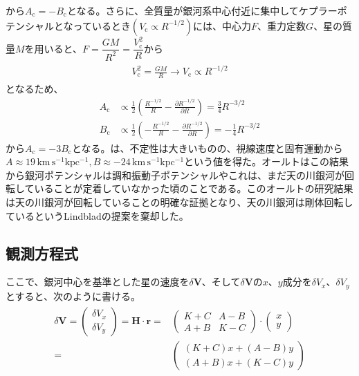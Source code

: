 から$A_{\mathrm{c}} = -B_{\mathrm{c}}$となる。さらに、全質量が銀河系中心付近に集中してケプラーポテンシャルとなっているとき$(V_{\mathrm{c}} \propto R^{-1/2})$には、中心力$F$、重力定数$G$、星の質量$M$を用いると、$F = \dfrac{GM}{R^2} = \dfrac{V_{\mathrm{c}}^2}{R}$から
\begin{align}
\begin{aligned}
    V_{\mathrm{c}}^2 = \frac{GM}{R} \to V_{\mathrm{c}} \propto R^{-1/2}
\end{aligned}
\end{align}
となるため、
\begin{subequations}
\begin{align}
	A_{\mathrm{c}} &\propto \frac{1}{2}\left( \frac{R^{-1/2}}{R} - \frac{\partial R^{-1/2}}{\partial R} \right) = \frac{3}{4}R^{-3/2}\\
	B_{\mathrm{c}} &\propto \frac{1}{2}\left( -\frac{R^{-1/2}}{R} - \frac{\partial R^{-1/2}}{\partial R} \right) = -\frac{1}{4}R^{-3/2}
\end{align}
\end{subequations}
から$A_{\mathrm{c}}=-3B_{\mathrm{c}}$となる。\cite{Oort1927b}は、不定性は大きいものの、視線速度と固有運動から$A\approx 19\,\mathrm{km\,s^{-1} kpc^{-1}}, B\approx -24\,\mathrm{km\,s^{-1} kpc^{-1}}$という値を得た。オールトはこの結果から銀河ポテンシャルは調和振動子ポテンシャルやこれは、まだ天の川銀河が回転していることが定着していなかった頃のことである。このオールトの研究結果は天の川銀河が回転していることの明確な証拠となり、天の川銀河は剛体回転しているというLindbladの提案を棄却した。



\subsection{観測方程式 \label{観測方程式}}
ここで、銀河中心を基準とした星の速度を$\delta\pmb{V}$、そして$\delta\pmb{V}$の$x、y$成分を$\delta V_x、\delta V_y$とすると、次のように書ける。
\begin{align}
\begin{aligned}
	\delta\pmb{V} =
	\left(
	\begin{array}{c}
	 	\delta V_x\\
		\delta V_y
	\end{array}
	\right)
	=
	\pmb{H} \cdot \pmb{r}
	=&
	\left(
	\begin{array}{cc}
	 	K+C & A-B\\
		A+B & K-C
	\end{array}
	\right)
	\cdot
	\left(
	\begin{array}{c}
	 	x\\
		y
	\end{array}
	\right)\\
	=&
	\left(
	\begin{array}{c}
	 	(K+C)x + (A-B)y\\
		(A+B)x + (K-C)y
	\end{array}
	\right)
\end{aligned} \label{eq266}
\end{align}

